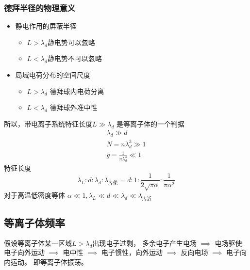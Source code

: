 \subsubsection{德拜半径的物理意义}
\begin{itemize}
  \item 静电作用的屏蔽半径
\begin{itemize}
  \item \(L>\lambda_d\)静电势可以忽略
  \item \(L<\lambda_d\)静电势不可以忽略
\end{itemize}
\item 局域电荷分布的空间尺度
 \begin{itemize}
  \item \(L>\lambda_d\) 德拜球内电荷分离
  \item \(L<\lambda_d\) 德拜球外准中性
\end{itemize} 
\end{itemize}
所以，带电离子系统特征长度\(L \gg  \lambda_d\) 是等离子体的一个判据
\begin{gather*}
  \lambda_d \gg  d \\
  N = n \lambda_d^3 \gg  1  \\
  g = \frac{1}{n \lambda_d^3} \ll  1
\end{gather*}
特征长度
\begin{equation}
  \lambda_L : d : \lambda_d : \lambda_{\text{库伦}} = d : 1 : \frac{1}{2\sqrt{\pi \alpha}} : \frac{1}{\pi \alpha^2}
\end{equation}
对于高温低密度等体 \(\alpha \ll  1, \lambda_L \ll d \ll  \lambda_d \ll  \lambda_{\text{库近}}\)

\subsection{等离子体频率}
假设等离子体某一区域\(L > \lambda_d\)出现电子过剩，
多余电子产生电场
\(\implies\)
电场驱使电子向外运动
\(\implies\)
电中性
\(\implies\)
电子惯性，向外运动
\(\implies\)
反向电场
\(\implies\)
电子向内运动。
即等离子体振荡。

